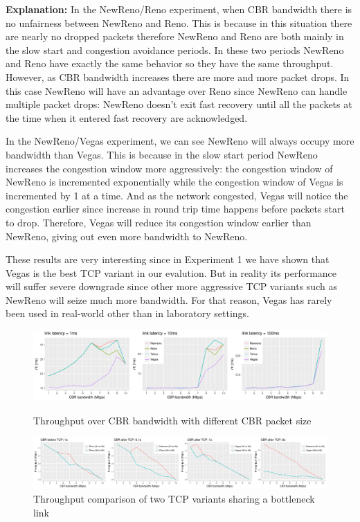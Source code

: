 \documentclass[USenglish,oneside,twocolumn]{article}
\begin{document}
\noindent \textbf{Explanation:} In the NewReno/Reno experiment, when CBR bandwidth there is no unfairness between NewReno and Reno. This is because in this situation there are nearly no dropped packets therefore NewReno and Reno are both mainly in the slow start and congestion avoidance periods. In these two periods NewReno and Reno have exactly the same behavior so they have the same throughput. However, as CBR bandwidth increases there are more and more packet drops. In this case NewReno will have an advantage over Reno since NewReno can handle multiple packet drops: NewReno doesn't exit fast recovery until all the packets at the time when it entered fast recovery are acknowledged.

In the NewReno/Vegas experiment, we can see NewReno will always occupy more bandwidth than Vegas. This is because in the slow start period NewReno increases the congestion window more aggressively: the congestion window of NewReno is incremented exponentially while the congestion window of Vegas is incremented by 1 at a time. And as the network congested, Vegas will notice the congestion earlier since increase in round trip time happens before packets start to drop. Therefore, Vegas will reduce its congestion window earlier than NewReno, giving out even more bandwidth to NewReno.

These results are very interesting since in Experiment 1 we have shown that Vegas is the best TCP variant in our evalution. But in reality its performance will suffer severe downgrade since other more aggressive TCP variants such as NewReno will seize much more bandwidth. For that reason, Vegas has rarely been used in real-world other than in laboratory settings.

\begin{figure}
	\includegraphics[width=\linewidth]{fig/experiment1/rtt.pdf}
	\captionsetup{justification=centering}
	\caption{Throughput over CBR bandwidth with different CBR packet size}
	
	
	\includegraphics[width=\linewidth]{fig/experiment2/throughput.pdf}
	\captionsetup{justification=centering}
	\caption{Throughput comparison of two TCP variants sharing a bottleneck link}
	\label{throughput fairness}
\end{figure}
\end{document}
